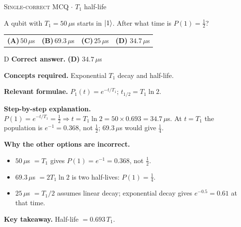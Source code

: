 \documentclass[11pt,a4paper]{article}
\newcommand{\optlabel}[1]{\textbf{(#1)}}
\newcommand{\correctlabel}[1]{\textcolor{okgreen}{\textbf{(#1)}\,\ding{51}}}
\newenvironment{qitem}[1]{\begin{list}{}{\setlength{\leftmargin}{3.3em}\setlength{\labelwidth}{3.1em}%
  \setlength{\labelsep}{0.2em}\setlength{\topsep}{3pt}\setlength{\parsep}{3pt}}\item[\textbf{Q.#1}\hfill]}{\end{list}}
\newcommand{\qsep}{\par\vspace{2pt}{\color{black!15}\hrule}\vspace{4pt}}
\newcommand{\qmeta}[2]{{\footnotesize\color{black!60}\textsc{#1} \;$\cdot$\; #2}\par}
\begin{document}
\begin{qitem}{26}
\qmeta{Single-correct MCQ}{$T_1$ half-life}
A qubit with $T_1 = 50\,\mu$s starts in $\ket1$. After what time is $P(1) = \frac12$?
\par\smallskip\noindent\begin{tabularx}{\linewidth}{@{}*{4}{L}@{}}
\optlabel{A}\,$50\,\mu$s & \optlabel{B}\,$69.3\,\mu$s & \optlabel{C}\,$25\,\mu$s & \correctlabel{D}\,$34.7\,\mu$s
\end{tabularx}
\end{qitem}
\begin{solbox}{D}
\textbf{\color{brand}Correct answer.} \textcolor{okgreen}{\textbf{(D)}} $34.7\,\mu$s

\textbf{\color{brand}Concepts required.} Exponential $T_1$ decay and half-life.

\textbf{\color{brand}Relevant formulae.} $P_1(t) = e^{-t/T_1}$; $t_{1/2} = T_1\ln2$.

\textbf{\color{brand}Step-by-step explanation.} $P(1) = e^{-t/T_1} = \frac12 \Rightarrow t = T_1\ln2 = 50\times0.693 = 34.7\,\mu$s. At $t = T_1$ the population is $e^{-1} = 0.368$, not $\frac12$;
$69.3\,\mu$s would give $\frac14$.

\textbf{\color{brand}Why the other options are incorrect.}
\begin{itemize}[leftmargin=2.4em, itemsep=1pt, topsep=2pt]
\item[\textbf{(A)}] $50\,\mu$s $= T_1$ gives $P(1) = e^{-1} = 0.368$, not $\frac12$.
\item[\textbf{(B)}] $69.3\,\mu$s $= 2T_1\ln2$ is two half-lives: $P(1) = \frac14$.
\item[\textbf{(C)}] $25\,\mu$s $= T_1/2$ assumes linear decay; exponential decay gives $e^{-0.5} = 0.61$ at that time.
\end{itemize}
\textbf{\color{brand}Key takeaway.} Half-life $= 0.693\,T_1$.
\end{solbox}
\qsep
\end{document}
